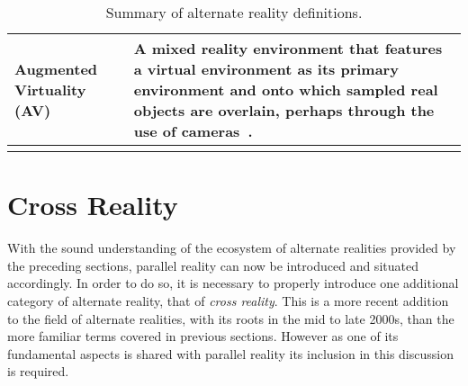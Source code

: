 \begin{center}
\begin{longtable}{ l p{10cm} }
\midrule


Augmented Virtuality (AV) & A mixed reality environment that features a virtual environment as its primary environment and onto which sampled real objects are overlain, perhaps through the use of cameras~\cite{caballero:behand}. \\


\bottomrule
\caption{Summary of alternate reality definitions.}
\label{adopted-alternate-reality-definitions}
\end{longtable}
\end{center}






\section{Cross Reality}
\label{sec_crossreality}

\newcommand{\SLfootnote}{\footnote{Second Life.}}

With the sound understanding of the ecosystem of alternate realities provided by the preceding sections, parallel reality can now be introduced and situated accordingly. In order to do so, it is necessary to properly introduce one additional category of alternate reality, that of \textit{cross reality}. This is a more recent addition to the field of alternate realities, with its roots in the mid to late 2000s, than the more familiar terms covered in previous sections. However as one of its fundamental aspects is shared with parallel reality its inclusion in this discussion is required.

